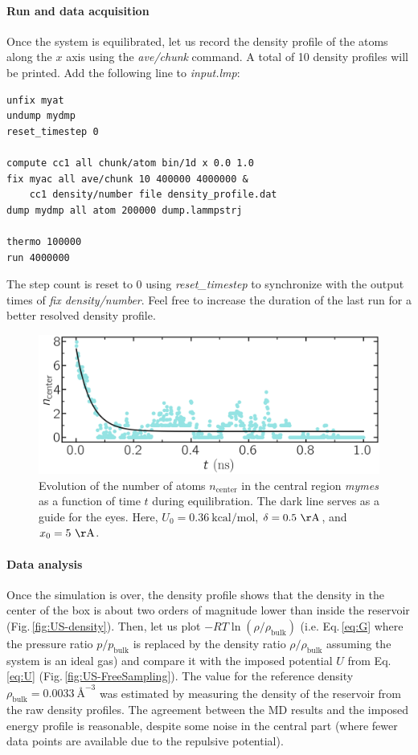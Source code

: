 \documentclass[9pt,tutorial]{livecoms}
\begin{document}
\paragraph{Run and data acquisition}
Once the system is equilibrated, let us record the density profile of
the atoms along the $x$ axis using
the \textit{ave/chunk} command. A total of 10 density profiles will be printed.
Add the following line to \textit{input.lmp}:
{\normalsize \begin{verbatim}
unfix myat
undump mydmp
reset_timestep 0

compute cc1 all chunk/atom bin/1d x 0.0 1.0
fix myac all ave/chunk 10 400000 4000000 &
    cc1 density/number file density_profile.dat
dump mydmp all atom 200000 dump.lammpstrj

thermo 100000
run 4000000
\end{verbatim}}
The step count is reset to 0 using \textit{reset\_timestep} to synchronize
with the output times of \textit{fix density/number}. Feel free to increase the
duration of the last run for a better resolved density profile.

\begin{figure}
\centering
\includegraphics[width=\linewidth]{US-density-evolution}
\caption{Evolution of the number of atoms $n_\text{center}$ in the central
region \textit{mymes} as a function of time $t$ during equilibration. The dark line
serves as a guide for the eyes. Here, $U_0 = 0.36~\text{kcal/mol}$,
$\delta = 0.5~\mathrm{\AA{}}$, and $x_0 = 5~\mathrm{\AA{}}$.}
\label{fig:US-density-evolution}
\end{figure}

\paragraph{Data analysis}

Once the simulation is over, the density profile shows that the density in the center of the box is
about two orders of magnitude lower than inside the reservoir (Fig.\,\ref{fig:US-density}).
Then, let us plot $-R T \ln(\rho/\rho_\mathrm{bulk})$ (i.e. Eq.\,\eqref{eq:G} where
the pressure ratio $p/p_\mathrm{bulk}$ is replaced by the density ratio
$\rho/\rho_\mathrm{bulk}$ assuming the system is an ideal gas) and compare it
with the imposed potential $U$ from Eq.\,\eqref{eq:U} (Fig.\,\ref{fig:US-FreeSampling}).
The value for the reference density $\rho_\text{bulk} = 0.0033~\text{\AA{}}^{-3}$
was estimated by measuring the density of the reservoir from the raw density
profiles. The agreement between the MD results and the imposed energy profile
is reasonable, despite some noise in the central part (where fewer data points
are available due to the repulsive potential).
\end{document}
